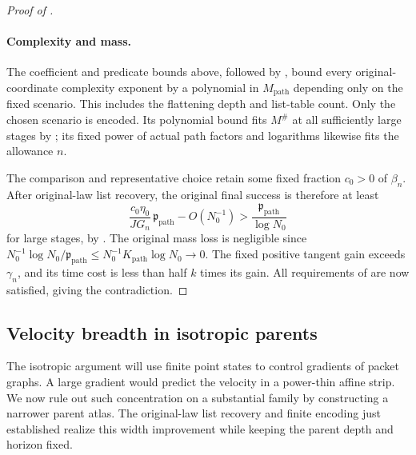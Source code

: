 \begin{proof}[Proof of ]
\paragraph{Complexity and mass.}
The coefficient and predicate bounds above, followed by
, bound every original-coordinate complexity
exponent by a polynomial in \(M_{\mathrm{path}}\) depending only on
the fixed scenario.  This includes the flattening depth and list-table
count.  Only the chosen scenario is encoded.  Its polynomial bound
fits \(M^\#\) at all sufficiently large stages by
; its fixed power of actual path factors
and logarithms likewise fits the allowance \(n\).

The comparison and representative choice retain some fixed fraction
\(c_0>0\) of \(\beta_n\).  After original-law list recovery, the
original final success is therefore at least
\begin{equation}
\frac{c_0\eta_0}{J G_n}\,\mathfrak p_{\mathrm{path}}
       -O(N_0^{-1})
 >
 \frac{\mathfrak p_{\mathrm{path}}}{\log N_0}
 \label{a03:final-coverage}
\end{equation}
for large stages, by .  The original mass loss
is negligible since
\(N_0^{-1}\log N_0/\mathfrak p_{\mathrm{path}}
 \le N_0^{-1}K_{\mathrm{path}}\log N_0\to0\).
The fixed positive tangent gain exceeds \(\gamma_n\), and its time
cost is less than half \(k\) times its gain.  All requirements of
 are now satisfied, giving the contradiction.

\end{proof}



\subsection{Velocity breadth in isotropic parents}

The isotropic argument will use finite point states to control gradients
of packet graphs.  A large gradient would predict the velocity in a
power-thin affine strip.  We now rule out such concentration on a
substantial family by constructing a narrower parent atlas.  The
original-law list recovery and finite encoding just established realize
this width improvement while keeping the parent depth and horizon fixed.

